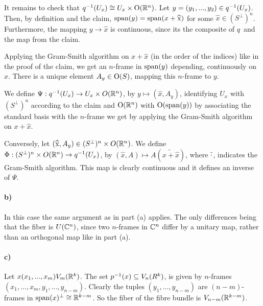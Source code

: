 \documentclass[a4paper,11pt,english]{article}
\newcommand{\orth}{\bot}
\begin{document}
\begin{exercise}[1]
It remains to check that $q^{-1}(U_x) \cong U_x \times \operatorname{O}(\mathbb{R}^n)$. Let $y = (y_1, ...,
y_2) \in q^{-1}(U_x)$. Then, by definition and the claim, $\span(y) =
\span(x + \hat x)$ for some $\hat x \in (S^{\orth})^n$. Furthermore, the mapping
$y \to \hat x$ is continuous, since its the composite of $q$ and the map from the
claim. 

Applying the Gram-Smith algorithm on $x + \hat x$ (in the order of the indices)
like in the proof of the claim, we get an $n$-frame in $\operatorname{span}(y)$ depending,
continuously on $\hat x$. There is a unique element $A_y\in \operatorname{O}(S)$, mapping
this $n$-frame to $y$. 

We define $\Psi: q^{-1}(U_x) \to U_x \times O(\mathbb{R}^n)$, by $y \mapsto (\hat x,
A_y)$, identifying $U_x$ with $(S^\orth)^n$ according to the claim and
$\operatorname{O}(\mathbb{R}^n)$ with $\operatorname{O}(\operatorname{span}(y))$ by associating the standard basis with the
$n$-frame we get by applying the Gram-Smith algorithm on $x+\hat x$.



Conversely, let $(\hat x, A_y) \in (S^\orth)^n \times O(\R^n)$. We define $\Phi:
(S^\orth)^n \times O(\R^n) \to q\i(U_x)$, by $(\hat x, A) \mapsto
A(\widetilde{x+\hat x})$, where $\tilde \cdot$, indicates the Gram-Smith
algorithm. This map is clearly continuous and it defines an inverse of $\Psi$.



\paragraph{b)}
In this case the same argument as in part (a) applies. The only differences being
that the fiber is $U(\mathbb{C}^n)$, since two $n$-frames in $\mathbb{C}^n$ differ by a unitary
map, rather than an orthogonal map like in part (a).

\paragraph{c)}
Let $x(x_1,...,x_m) V_m(\mathbb{R}^k)$. The set
$p^{-1}(x) \subseteq V_n(R^k)$, is given by $n$-frames $(x_1,...,x_m, y_1,..., y_{n-m})$. Clearly the
tuples $(y_1,...,y_{n-m})$ are $(n-m)$-frames in $\span(x)^\orth \cong
\R^{k-m}$. So the fiber of the fibre bundle is $V_{n-m}(\mathbb{R}^{k-m})$.


\end{exercise}
\end{document}
